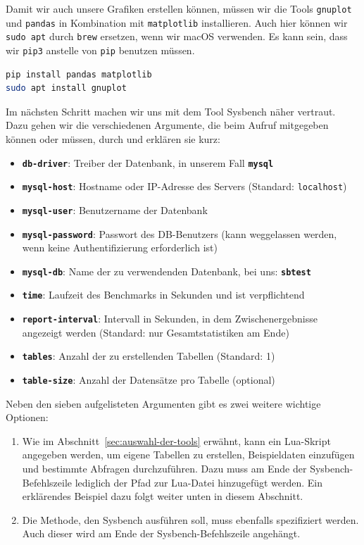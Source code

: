 Damit wir auch unsere Grafiken erstellen können, müssen wir die Tools \texttt{gnuplot} und \texttt{pandas} in Kombination mit \texttt{matplotlib} installieren.
Auch hier können wir \texttt{sudo apt} durch \texttt{brew} ersetzen, wenn wir macOS verwenden.
Es kann sein, dass wir \texttt{pip3} anstelle von \texttt{pip} benutzen müssen.

\vspace{-5pt}
\begin{lstlisting}[language=bash]
pip install pandas matplotlib
sudo apt install gnuplot
\end{lstlisting}
\vspace{-9pt}

Im nächsten Schritt machen wir uns mit dem Tool Sysbench näher vertraut.
Dazu gehen wir die verschiedenen Argumente, die beim Aufruf mitgegeben können oder müssen, durch und erklären sie kurz:

\vspace{-5pt}
\begin{itemize}
    \setlength{\itemsep}{-7pt}
    \item \textbf{\texttt{db-driver}}: Treiber der Datenbank, in unserem Fall \textbf{\texttt{mysql}}
    \item \textbf{\texttt{mysql-host}}: Hostname oder IP-Adresse des Servers (Standard: \texttt{localhost})
    \item \textbf{\texttt{mysql-user}}: Benutzername der Datenbank
    \item \textbf{\texttt{mysql-password}}: Passwort des DB-Benutzers (kann weggelassen werden, wenn keine Authentifizierung erforderlich ist)
    \item \textbf{\texttt{mysql-db}}: Name der zu verwendenden Datenbank, bei uns: \textbf{\texttt{sbtest}}
    \item \textbf{\texttt{time}}: Laufzeit des Benchmarks in Sekunden und ist verpflichtend
    \item \textbf{\texttt{report-interval}}: Intervall in Sekunden, in dem Zwischenergebnisse angezeigt werden (Standard: nur Gesamtstatistiken am Ende)
    \item \textbf{\texttt{tables}}: Anzahl der zu erstellenden Tabellen (Standard: 1)
    \item \textbf{\texttt{table-size}}: Anzahl der Datensätze pro Tabelle (optional)
\end{itemize}

Neben den sieben aufgelisteten Argumenten gibt es zwei weitere wichtige Optionen:
\begin{enumerate}
    \item Wie im Abschnitt~\ref{sec:auswahl-der-tools} erwähnt, kann ein Lua-Skript angegeben werden, um eigene Tabellen zu erstellen, Beispieldaten einzufügen und bestimmte Abfragen durchzuführen.
    Dazu muss am Ende der Sysbench-Befehlszeile lediglich der Pfad zur Lua-Datei hinzugefügt werden.
    Ein erklärendes Beispiel dazu folgt weiter unten in diesem Abschnitt.
    \item Die Methode, den Sysbench ausführen soll, muss ebenfalls spezifiziert werden.
    Auch dieser wird am Ende der Sysbench-Befehlszeile angehängt.
\end{enumerate}

